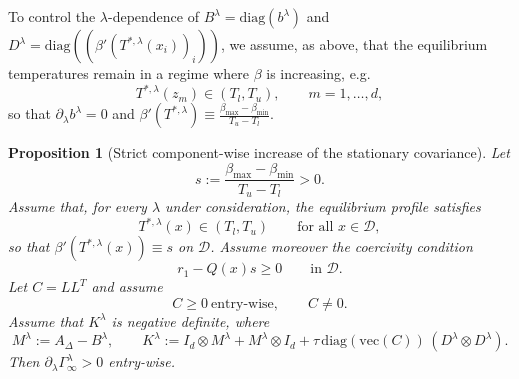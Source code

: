 \documentclass[10pt]{amsart}
\newtheorem{proposition}[theorem]{Proposition}
\numberwithin{equation}{section}
\begin{document}
To control the $\lambda$-dependence of $B^\lambda = \mathrm{diag}(b^\lambda)$ and $D^\lambda =\mathrm{diag} ((\beta'(T^{*,\lambda}(x_i))_i)) $, we assume, as above, that the equilibrium temperatures
remain in a regime where $\beta$ is increasing, e.g.
\begin{equation}
\label{eq:Tref-assumption}
T^{*,\lambda}(z_m) \in (T_l, T_u),\qquad m=1,\dots,d,
\end{equation}
so that $\partial_ \lambda b^\lambda=0$ and
$\beta'(T^{*,\lambda})\equiv \tfrac{\beta_{\max} - \beta_{\min}}{T_u - T_l}$.
\begin{proposition}[Strict component-wise increase of the stationary covariance]
\label{prop:monotone-covariance}
Let
$$
s:=\frac{\beta_{\max}-\beta_{\min}}{T_u-T_l}>0 .
$$
Assume that, for every $\lambda$ under consideration, the equilibrium profile satisfies
$$
T^{*,\lambda}(x)\in(T_l,T_u)\qquad \text{for all }x\in\mathcal D,
$$
so that $\beta'(T^{*,\lambda}(x))\equiv s$ on $\mathcal D$.
Assume moreover the coercivity condition
\begin{equation}
\label{eq:coercivity}
r_1-Q(x) s \geq 0\qquad\text{in }\mathcal D.
\end{equation}
Let $C=LL^T$ and assume
$$
C\geq 0\ \text{entry-wise},\qquad C\neq 0.
$$
Assume that $K^\lambda$ is negative definite, where
$$
M^\lambda:=A_\Delta-B^\lambda,
\qquad
K^\lambda:= I_d\otimes M^\lambda + M^\lambda\otimes I_d
+\tau \,\mathrm{diag}(\mathrm{vec}(C))\,(D^\lambda\otimes D^\lambda).
$$
Then
$
\partial_\lambda \Gamma_\infty^\lambda > 0$ entry-wise.
\end{proposition}
\end{document}
